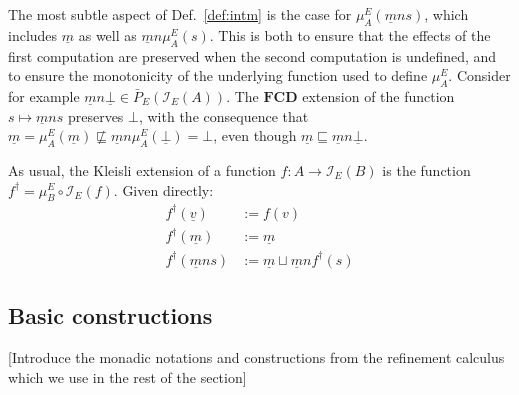 \documentclass[sigplan,10pt,review,anonymous]{acmart}
\begin{document}

The most subtle aspect of Def.~\ref{def:intm}
is the case for $\mu^E_A(\underline{m} n s)$,
which includes $\underline{m}$ as well as $\underline{m} n \mu^E_A(s)$.
This is both
to ensure that the effects of the first computation are preserved
when the second computation is undefined, and
to ensure the monotonicity of the underlying function
used to define $\mu^E_A$.
Consider for example
$\underline{m} n \underline{\bot} \in \bar{P}_E(\mathcal{I}_E(A))$.
The $\mathbf{FCD}$ extension
of the function $s \mapsto \underline{m} n s$
preserves $\bot$,
with the consequence that
$\underline{m} = \mu^E_A(\underline{m}) \nsqsubseteq
 \underline{m} n \mu^E_A(\underline{\bot}) = \bot$,
even though
$\underline{m} \sqsubseteq \underline{m} n \underline{\bot}$.

As usual,
the Kleisli extension of a function $f : A \rightarrow \mathcal{I}_E(B)$
is the function $f^\dagger = \mu^E_B \circ \mathcal{I}_E(f)$.
Given directly:
\begin{align*}
  f^\dagger(\underline{v}) &:= f(v) \\
  f^\dagger(\underline{m}) &:= \underline{m} \\
  f^\dagger(\underline{m} n s) &:=
    \underline{m} \sqcup \underline{m} n f^\dagger(s)
\end{align*}


\subsection{Basic constructions} %

[Introduce the monadic notations and constructions
from the refinement calculus which we use in the rest
of the section]
\end{document}
